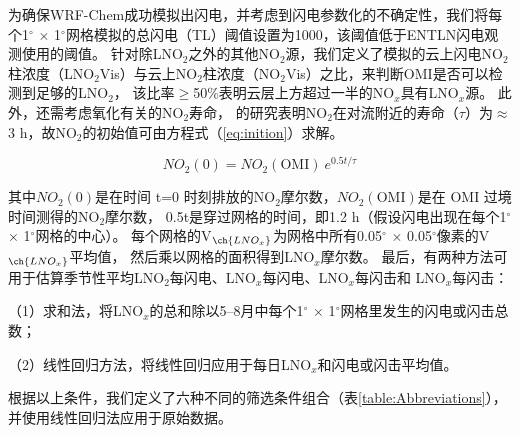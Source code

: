 为确保WRF-Chem成功模拟出闪电，并考虑到闪电参数化的不确定性，我们将每个1$^{\circ}$ $\times$ 1$^{\circ}$网格模拟的总闪电（TL）阈值设置为1000，该阈值低于ENTLN闪电观测使用的阈值。
针对除LNO$_2$之外的其他NO$_2$源，我们定义了模拟的云上闪电NO$_2$柱浓度（LNO$_2$Vis）与云上NO$_2$柱浓度（NO$_2$Vis）之比，来判断OMI是否可以检测到足够的LNO$_2$，
该比率$\geq$50\%表明云层上方超过一半的NO$_x$具有LNO$_x$源。
此外，还需考虑氧化有关的NO$_2$寿命，
\citet{Nault.2017}的研究表明NO$_2$在对流附近的寿命（$\tau$）为$\approx$3 h，故NO$_2$的初始值可由方程式（\ref{eq:inition}）求解。

\begin{equation} \label{eq:inition}
NO_2(0) = NO_2(\mathrm{OMI})\ e^{0.5t/\tau}
\end{equation}

其中$NO_2(0)$是在时间 t=0 时刻排放的NO$_2$摩尔数，$NO_2(\mathrm{OMI})$是在 OMI 过境时间测得的NO$_2$摩尔数，
0.5t是穿过网格的时间，即1.2 h（假设闪电出现在每个1$^{\circ}$ $\times$ 1$^{\circ}$网格的中心）。
每个网格的V$_{\ch{LNO_x}}$为网格中所有0.05$^{\circ}$ $\times$ 0.05$^{\circ}$像素的V$_{\ch{LNO_x}}$平均值，
然后乘以网格的面积得到LNO$_x$摩尔数。
最后，有两种方法可用于估算季节性平均LNO$_2$每闪电、LNO$_x$每闪电、LNO$_x$每闪击和 LNO$_x$每闪击：

（1）求和法，将LNO$_x$的总和除以5--8月中每个1$^{\circ}$ $\times$ 1$^{\circ}$网格里发生的闪电或闪击总数；

（2）线性回归方法，将线性回归应用于每日LNO$_x$和闪电或闪击平均值。


根据以上条件，我们定义了六种不同的筛选条件组合（表\ref{table:Abbreviations}），并使用线性回归法应用于原始数据。


